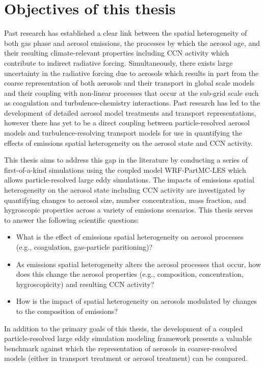 \section{Objectives of this thesis}

Past research has established a clear link between the spatial heterogeneity of both gas phase and aerosol emissions, the processes by which the aerosol age, and their resulting climate-relevant properties including CCN activity which contribute to indirect radiative forcing. Simultaneously, there exists large uncertainty in the radiative forcing due to aerosols which results in part from the coarse representation of both aerosols and their transport in global scale models and their coupling with non-linear processes that occur at the sub-grid scale such as coagulation and turbulence-chemistry interactions. Past research has led to the development of detailed aerosol model treatments and transport representations, however there has yet to be a direct coupling between particle-resolved aerosol models and turbulence-resolving transport models for use in quantifying the effects of emissions spatial heterogeneity on the aerosol state and CCN activity. 

This thesis aims to address this gap in the literature by conducting a series of first-of-a-kind simulations using the coupled model WRF-PartMC-LES which allows particle-resolved large eddy simulations. The impacts of emissions spatial heterogeneity on the aerosol state including CCN activity are investigated by quantifying changes to aerosol size, number concentration, mass fraction, and hygroscopic properties across a variety of emissions scenarios. This thesis serves to answer the following scientific questions:
\begin{itemize}
\item What is the effect of emissions spatial heterogeneity on aerosol processes (e.g., coagulation, gas-particle paritioning)?
\item As emissions spatial heterogeneity alters the aerosol processes that occur, how does this change the aerosol properties (e.g., composition, concentration, hygroscopicity) and resulting CCN activity? 
\item How is the impact of spatial heterogeneity on aerosols modulated by changes to the composition of emissions?
\end{itemize}

In addition to the primary goals of this thesis, the development of a coupled particle-resolved large eddy simulation modeling framework presents a valuable benchmark against which the representation of aerosols in coarser-resolved models (either in transport treatment or aerosol treatment) can be compared.


